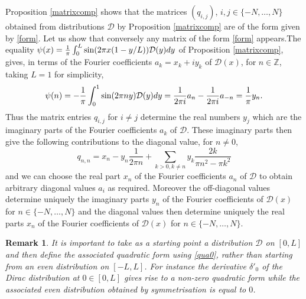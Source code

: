 \documentclass{amsart}
\newtheorem{rem}[thm]{Remark}
\def\Z{{\mathbb Z}}
\def\cD{{\mathcal D}}
\def\sin{{{\rm sin}}}
\def\Z{{\mathbb Z}}
\def\cD{{\mathcal D}}
\def\sin{{{\rm sin}}}
\begin{document}
\proof Proposition \ref{matrixcomp} shows that the matrices $(q_{i,j})$, $i,j\in \{-N,\ldots,N\}$ obtained from distributions $\cD$ by Proposition \ref{matrixcomp} are of the form given by \eqref{form}. Let us show that conversely any matrix of the form \eqref{form} appears.\newline The equality $\psi(x)=\frac 1 \pi \int_0^L \sin(2\pi x(1- y/L))\cD(y)dy$ of Proposition \ref{matrixcomp}, gives, in terms of the Fourier coefficients $a_k=x_k+i y_k$ of $\cD(x)$, for $n\in \Z$, taking $L=1$ for simplicity, 
$$
\psi(n)=-\frac 1 \pi \int_0^1 \sin(2\pi ny)\cD(y)dy=\frac{1}{2\pi i}a_n-\frac{1}{2\pi i}a_{-n}=\frac 1 \pi y_n.
$$ 
Thus the matrix entries  $q_{i,j}$ for $i\neq j$ determine the real numbers $y_j$ which are the imaginary parts of the Fourier coefficients $a_k$ of $\cD$. These imaginary parts then give the following contributions to the diagonal value, for $n\neq 0$,
\begin{equation}\label{diagval}
q_{n,n}=x_n-y_n\frac{1}{2\pi n}+\sum_{k>0,k\neq n}y_k\frac{2 k}{\pi  n^2-\pi  k^2}
\end{equation} 
and we can choose the real part $x_n$ of the Fourier coefficients $a_n$ of $\cD$ to obtain arbitrary diagonal values $a_i$ as required. Moreover the off-diagonal values determine uniquely the imaginary parts $y_n$ of the Fourier coefficients of $\cD(x)$ for $n\in \{-N,\ldots,N\}$ and the diagonal values then determine uniquely the real parts $x_n$ of the Fourier coefficients of $\cD(x)$ for $n\in \{-N,\ldots,N\}$.
\endproof

\begin{rem}\label{nuance} It is important to take as a starting point a distribution $\cD$ on $[0,L]$ and then define the associated quadratic form using \eqref{qua0}, rather than starting from an even distribution on $[-L,L]$. For instance the derivative $\delta'_0$ of the Dirac distribution at $0\in [0,L]$ gives rise to a non-zero quadratic form while the associated even distribution obtained by symmetrisation is equal to $0$.
\end{rem}
\end{document}
